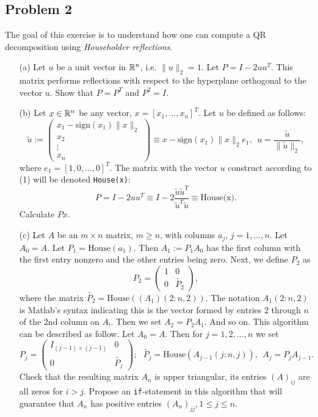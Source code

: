 \documentclass[12pt]{report}
\begin{document}
\begin{problem}%
\subsection*{Problem 2}

The goal of this exercise is to understand how one can compute a QR decomposition using \textit{Householder reflections}.
\begin{enumerate}
    \item[(a)] Let $u$ be a unit vector in ${\mathbb R}^n$, i.e. $\|u\|_2 =1$. Let $P = I - 2uu^T.$ This matrix performs reflections with respect to the hyperplane orthogonal to the vector $u$. Show that $P = P^T$ and $P^2 = I$.
    
    
    \item[(b)] Let $x \in {\mathbb R}^n$ be any vector, $x = [x_1,\dots,x_n]^T$. Let $u$ be defined as follows:
    \[
         \tilde{u} := \begin{pmatrix}
            x_1 - \text{sign}(x_1)\|x\|_2\\x_2\\\vdots\\x_n
         \end{pmatrix} \equiv x - \text{sign}(x_1)\|x\|_2e_1,~~u=\frac{\tilde{u}}{\|\tilde{u}\|_2},
    \]
    where $e_1 = [1,0,\dots,0]^T$. The matrix with the vector $u$ construct according to (1) will be denoted \verb+House(x)+:
    \[
         P = I - 2uu^T \equiv I - 2 \frac{\tilde{u}\tilde{u}^T}{\tilde{u}^T\tilde{u}}\equiv \text{House(x)}.
    \]
    Calculate $Px$.
    
    
    \item[(c)] Let $A$ be an $m \times n$ matrix, $m\geq n$, with columns $a_j$, $j=1,\dots,n$. Let $A_0 = A$. Let $P_1 = \text{House}(a_1).$ Then $A_1 := P_1A_0$ has the first column with the first entry nonzero and the other entries being zero. Next, we define $P_2$ as
    \[
         P_2 = \begin{pmatrix}
            1&0\\0&\tilde{P_2}
         \end{pmatrix},
    \]
    where the matrix $\tilde{P_2} = \text{House}((A_1)(2:n,2))$. The notation $A_1(2:n,2)$ is Matlab's syntax indicating this is the vector formed by entries $2$ through $n$ of the 2nd column on $A_!$. Then we set $A_2 = P_2 A_1$. And so on. This algorithm can be described as follow. Let $A_0 = A$. Then for $j = 1,2,\dots,n$ we set
    \[
         P_j = \begin{pmatrix}
            I_{(j-1)\times(j-1)} & 0\\ 0 & \tilde{P_j}
         \end{pmatrix};~~~ \tilde{P_j} = \text{House}(A_{j-1}(j:n,j)), ~~ A_j = P_jA_{j-1}.
    \]
    Check that the resulting matrix $A_n$ is upper triangular, its entries $(A)_{ij}$ are all zeros for $i > j$. Propose an \verb+if+-statement in this algorithm that will guarantee that $A_n$ has positive entries $(A_n)_{jj}, 1 \leq j \leq n$.
    


\end{enumerate}
\end{problem}
\end{document}
